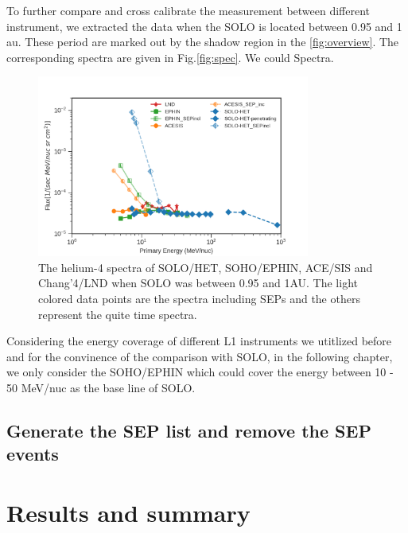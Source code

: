 To further compare and cross calibrate the measurement between different instrument, we extracted the data when the SOLO is located between 0.95 and 1 au. These period are marked out by the shadow region in the \ref{fig:overview}. The corresponding spectra are given in Fig.\ref{fig:spec}. 
We could 
Spectra.

\begin{figure}
    \centering
    \includegraphics[width = 0.8\textwidth]{images/ACR/1AU_comparison_ACE_EPHIN_SOLO_SEPIncl_Helium.png}
    \caption{The helium-4 spectra of SOLO/HET, SOHO/EPHIN, ACE/SIS and Chang'4/LND when SOLO was between 0.95 and 1AU. The light colored data points are the spectra including SEPs and the others represent the quite time spectra.}
\end{figure}

Considering the energy coverage of different L1 instruments we utitlized before and for the convinence of the comparison with SOLO, in the following chapter, we only consider the SOHO/EPHIN which could cover the energy between 10 - 50 MeV/nuc as the base line of SOLO.

\subsection{}

\subsection{Generate the SEP list and remove the SEP events}

\subsection{}

\section{Results and summary}







%
